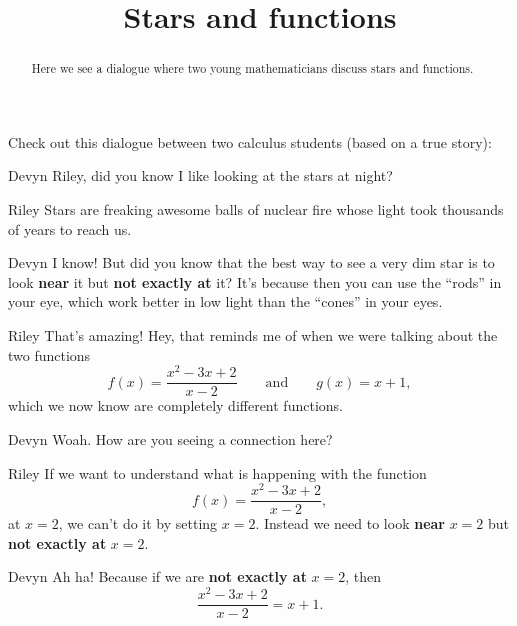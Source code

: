 \documentclass{ximera}
\title[Break-Ground:]{Stars and functions}
\begin{document}
\begin{abstract}
Here we see a dialogue where two young mathematicians discuss stars
and functions.
\end{abstract}
\maketitle

Check out this dialogue between two calculus students (based on a true
story):

\begin{dialogue}
\item[Devyn] Riley, did you know I like looking at the stars at night?
\item[Riley] Stars are freaking awesome balls of nuclear fire whose
  light took thousands of years to reach us.
\item[Devyn] I know! But did you know that the best way to see a very
  dim star is to look \textbf{near} it but \textbf{not exactly at} it? It's
  because then you can use the ``rods'' in your eye, which work better
  in low light than the ``cones'' in your eyes.
\item[Riley] That's amazing! Hey, that reminds me of when we were talking about the two functions
  \[
  f(x) = \frac{x^2-3x+2}{x-2}\qquad\text{and}\qquad g(x)= x+1,
  \]
  which we now know are completely different functions.
\item[Devyn] Woah. How are you seeing a connection here?
\item[Riley] If we want to understand what is happening with the
  function
  \[
  f(x) = \frac{x^2-3x+2}{x-2},
  \]
  at $x=2$, we can't do it by setting $x=2$. Instead we need to look
  \textbf{near} $x=2$ but \textbf{not exactly at} $x=2$.
  \item[Devyn] Ah ha! Because if we are \textbf{not exactly at} $x=2$,
    then
    \[
    \frac{x^2-3x+2}{x-2} = x+1.
    \]
\end{dialogue}



\end{document}
